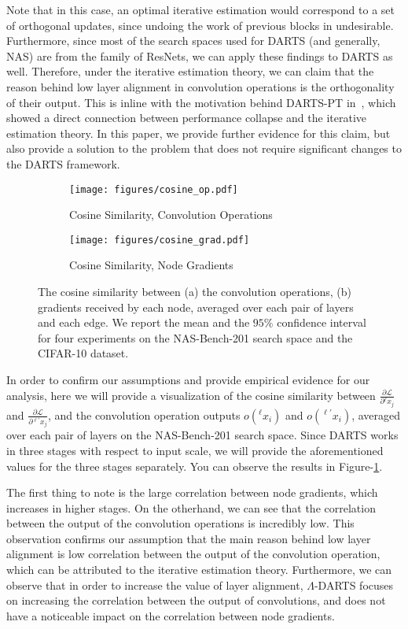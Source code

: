 \documentclass{article} \usepackage{fancyhdr, iclr2023_conference, times}
\newcommand{\mydarts}{$\Lambda$-DARTS\xspace}
\newcommand{\lambdafn}{layer alignment\xspace}
\begin{document}
\par Note that in this case, an optimal iterative estimation would correspond to a set of orthogonal updates, since undoing the work of previous blocks in undesirable. Furthermore, since most of the search spaces used for DARTS (and generally, NAS) are from the family of ResNets, we can apply these findings to DARTS as well. Therefore, under the iterative estimation theory, we can claim that the reason behind low \lambdafn in convolution operations is the orthogonality of their output. This is inline with the motivation behind DARTS-PT in~\citep{DBLP:conf/iclr/WangCCTH21}, which showed a direct connection between performance collapse and the iterative estimation theory. In this paper, we provide further evidence for this claim, but also provide a solution to the problem that does not require significant changes to the DARTS framework.
\begin{figure}[h]
    \centering
    \begin{subfigure}[h]{0.5\textwidth}
        \centering
        \texttt{[image: figures/cosine\_op.pdf]}
        \caption{Cosine Similarity, Convolution Operations}
    \end{subfigure}\begin{subfigure}[h]{0.5\textwidth}
        \centering
        \texttt{[image: figures/cosine\_grad.pdf]}
        \caption{Cosine Similarity, Node Gradients}
    \end{subfigure}
    \caption{The cosine similarity between (a) the convolution operations, (b) gradients received by each node, averaged over each pair of layers and each edge. We report the mean and the $95\%$ confidence interval for four experiments on the NAS-Bench-201 search space and the CIFAR-10 dataset.}
    \label{fig:cosine-sim}
\end{figure}
\par In order to confirm our assumptions and provide empirical evidence for our analysis, here we will provide a visualization of the cosine similarity between $\frac{\partial \mathcal{L}}{\partial {}^\ell x_j}$ and $\frac{\partial \mathcal{L}}{\partial {}^{\ell'} x_j}$, and the convolution operation outputs $o({}^\ell x_i)$ and $o({}^{\ell'} x_i)$, averaged over each pair of layers on the NAS-Bench-201 search space. Since DARTS works in three stages with respect to input scale, we will provide the aforementioned values for the three stages separately. You can observe the results in Figure-\ref{fig:cosine-sim}.
\par The first thing to note is the large correlation between node gradients, which increases in higher stages. On the otherhand, we can see that the correlation between the output of the convolution operations is incredibly low. This observation confirms our assumption that the main reason behind low \lambdafn is low correlation between the output of the convolution operation, which can be attributed to the iterative estimation theory. Furthermore, we can observe that in order to increase the value of \lambdafn, \mydarts focuses on increasing the correlation between the output of convolutions, and does not have a noticeable impact on the correlation between node gradients.
\end{document}
